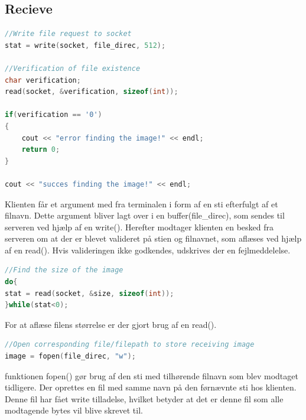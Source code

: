 \documentclass[12pt,fleqn,a4paper]{report}
\begin{document}
\subsection{Recieve}
\begin{framed}
\begin{lstlisting}[language=C++]
//Write file request to socket
stat = write(socket, file_direc, 512);
	
//Verification of file existence
char verification;
read(socket, &verification, sizeof(int));
	
if(verification == '0')
{
	cout << "error finding the image!" << endl;
	return 0;
}
	
cout << "succes finding the image!" << endl;
\end{lstlisting}
\end{framed}

Klienten får et argument med fra terminalen i form af en sti efterfulgt af et filnavn. Dette argument bliver lagt over i en buffer(file\_direc), som sendes til serveren ved hjælp af en write(). 
Herefter modtager klienten en besked fra serveren om at der er blevet valideret på stien og filnavnet, som aflæses ved hjælp af en read(). Hvis valideringen ikke godkendes, udskrives der en fejlmeddelelse.

\begin{framed}
\begin{lstlisting}[language=C++]
//Find the size of the image
do{
stat = read(socket, &size, sizeof(int));
}while(stat<0);
\end{lstlisting}
\end{framed}

For at aflæse filens størrelse er der gjort brug af en read().

\newpage
\begin{framed}
\begin{lstlisting}[language=C++]
//Open corresponding file/filepath to store receiving image
image = fopen(file_direc, "w");
\end{lstlisting}
\end{framed}

 funktionen fopen() gør brug af den sti med tilhørende filnavn som blev modtaget tidligere.
 Der oprettes en fil med samme navn på den førnævnte sti hos klienten. Denne fil har fået write tilladelse, hvilket betyder at det er denne fil som alle modtagende bytes vil blive skrevet til.
\end{document}
